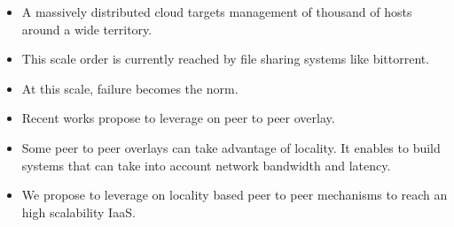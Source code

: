 \begin{itemize}

	\item A massively distributed cloud targets management of thousand of hosts 
	around a wide territory.

	\item This scale order is currently reached by file sharing systems like 
	bittorrent.

	\item At this scale, failure becomes the norm.

	\item Recent works propose to leverage on peer to peer overlay.

	\item Some peer to peer overlays can take advantage of locality. It enables
	to build systems that can take into account network bandwidth and latency.

	\item We propose to leverage on locality based peer to peer mechanisms to 
	reach an high scalability IaaS.

\end{itemize}
